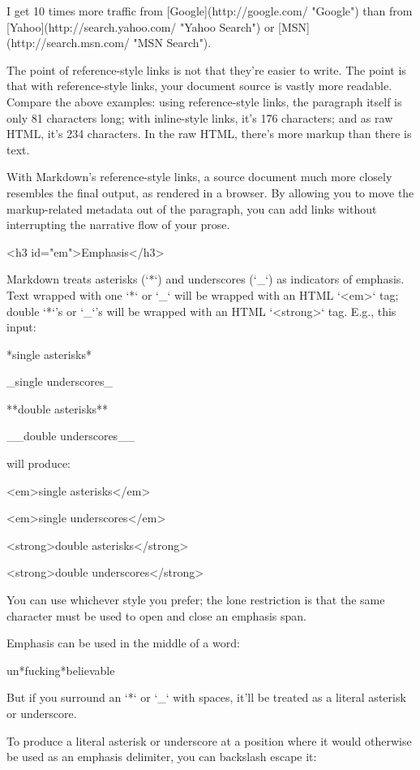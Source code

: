     I get 10 times more traffic from [Google](http://google.com/ "Google")
    than from [Yahoo](http://search.yahoo.com/ "Yahoo Search") or
    [MSN](http://search.msn.com/ "MSN Search").

The point of reference-style links is not that they're easier to
write. The point is that with reference-style links, your document
source is vastly more readable. Compare the above examples: using
reference-style links, the paragraph itself is only 81 characters
long; with inline-style links, it's 176 characters; and as raw HTML,
it's 234 characters. In the raw HTML, there's more markup than there
is text.

With Markdown's reference-style links, a source document much more
closely resembles the final output, as rendered in a browser. By
allowing you to move the markup-related metadata out of the paragraph,
you can add links without interrupting the narrative flow of your
prose.


<h3 id="em">Emphasis</h3>

Markdown treats asterisks (`*`) and underscores (`_`) as indicators of
emphasis. Text wrapped with one `*` or `_` will be wrapped with an
HTML `<em>` tag; double `*`'s or `_`'s will be wrapped with an HTML
`<strong>` tag. E.g., this input:

    *single asterisks*

    _single underscores_

    **double asterisks**

    __double underscores__

will produce:

    <em>single asterisks</em>

    <em>single underscores</em>

    <strong>double asterisks</strong>

    <strong>double underscores</strong>

You can use whichever style you prefer; the lone restriction is that
the same character must be used to open and close an emphasis span.

Emphasis can be used in the middle of a word:

    un*fucking*believable

But if you surround an `*` or `_` with spaces, it'll be treated as a
literal asterisk or underscore.

To produce a literal asterisk or underscore at a position where it
would otherwise be used as an emphasis delimiter, you can backslash
escape it:

